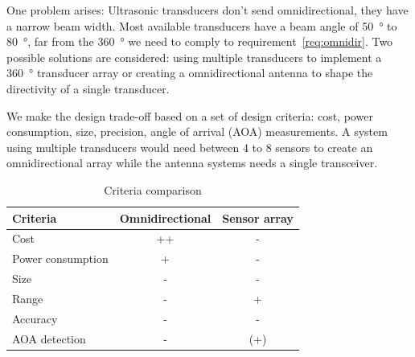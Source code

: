 One problem arises: Ultrasonic transducers don't send omnidirectional, they have a narrow beam width.
Most available transducers have a beam angle of \SI{50}{\degree} to \SI{80}{\degree}, far from the \SI{360}{\degree} we need to comply to requirement~\ref{req:omnidir}.
Two possible solutions are considered: using multiple transducers to implement a \SI{360}{\degree} transducer array or creating a omnidirectional antenna to shape the directivity of a single transducer.

We make the design trade-off based on a set of design criteria: cost, power consumption, size, precision, angle of arrival (AOA) measurements.
A system using multiple transducers would need between 4 to 8 sensors to create an omnidirectional array while the antenna systems needs a single transceiver.

\begin{table}[H]
\centering
\begin{tabular}{|l|c|c|}
    \hline
    Criteria            & Omnidirectional   & Sensor array \\
    \hline
    Cost                & ++ & -  \\
    Power consumption   & + & - \\
    Size                & - & - \\
    Range               & - & + \\
    Accuracy            & - & - \\
    AOA detection       & - & (+) \\
    \hline
\end{tabular}
\caption{Criteria comparison}
\label{tab:ant_crit}
\end{table}


